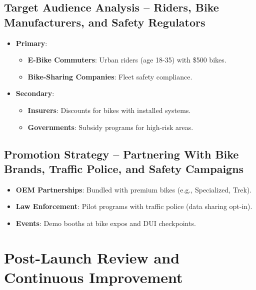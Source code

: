 \documentclass{article}
\begin{document}
\subsection{Target Audience Analysis -- Riders, Bike Manufacturers, and Safety Regulators}
\begin{itemize}
    \item \textbf{Primary}:
    \begin{itemize}
        \item \textbf{E-Bike Commuters}: Urban riders (age 18-35) with \geq \$500 bikes.
        \item \textbf{Bike-Sharing Companies}: Fleet safety compliance.
    \end{itemize}
    \item \textbf{Secondary}:
    \begin{itemize}
        \item \textbf{Insurers}: Discounts for bikes with installed systems.
        \item \textbf{Governments}: Subsidy programs for high-risk areas.
    \end{itemize}
\end{itemize}

\subsection{Promotion Strategy -- Partnering With Bike Brands, Traffic Police, and Safety Campaigns}
\begin{itemize}
    \item \textbf{OEM Partnerships}: Bundled with premium bikes (e.g., Specialized, Trek).
    \item \textbf{Law Enforcement}: Pilot programs with traffic police (data sharing opt-in).
    \item \textbf{Events}: Demo booths at bike expos and DUI checkpoints.
\end{itemize}

\newpage

\section{Post-Launch Review and Continuous Improvement}
\end{document}

